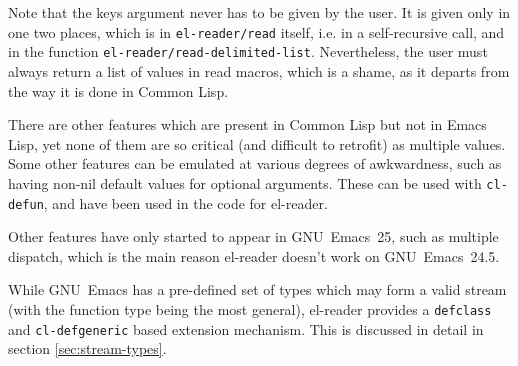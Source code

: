 \documentclass[a4paper,10pt,twoside]{report}
\newcommand{\el}{Emacs Lisp}
\newcommand{\cl}{Common Lisp}
\newcommand{\elr}{el-reader}
\newcommand{\fun}[1]{\texttt{#1}}
\newcommand{\emacs}{GNU~Emacs}
\newcommand{\emacsv}[1]{GNU~Emacs~#1}
\begin{document}
Note that the keys argument never has to be given by the user.  It is given only
in one two places, which is in \fun{el-reader/read} itself, i.e. in a
self-recursive call, and in the function \fun{el-reader/read-delimited-list}.
Nevertheless, the user must always return a list of values in read macros, which
is a shame, as it departs from the way it is done in \cl{}.

There are other features which are present in \cl{} but not in \el{}, yet none
of them are so critical (and difficult to retrofit) as multiple values.  Some
other features can be emulated at various degrees of awkwardness, such as having
non-nil default values for optional arguments.  These can be used with
\fun{cl-defun}, and have been used in the code for \elr{}.

Other features have only started to appear in \emacsv{25}, such as multiple
dispatch, which is the main reason \elr{} doesn’t work on \emacsv{24.5}.

While \emacs{} has a pre-defined set of types which may form a valid stream
(with the function type being the most general), \elr{} provides a
\fun{defclass} and \fun{cl-defgeneric} based extension mechanism.  This is
discussed in detail in section \ref{sec:stream-types}.




\end{document}
